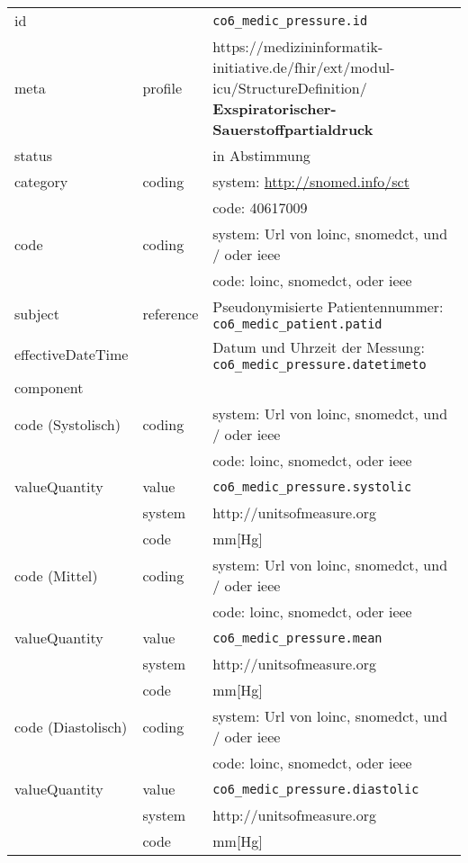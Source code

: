 \begin{longtable}{|l|l|p{7.5cm}|}
        \hline
        \rowcolor{lightgray} \multicolumn{3}{|l|}{Data Mapping (inhaltlich)} \\ \hline
        id &  & \texttt{co6\_medic\_pressure.id} \\ \hline
	meta & profile & https://medizininformatik-initiative.de/fhir/ext/modul-icu/StructureDefinition/\textbf{
Exspiratorischer-Sauerstoffpartialdruck} \\ \hline 
	status &  & in Abstimmung  \\ \hline 
	category & coding & system: \url{http://snomed.info/sct} \\ 
\cline{3-3}
        & & code: 40617009 \\ \hline
        code & coding & system: Url von \ac{loinc}, \ac{snomedct}, und / oder \ac{ieee} \\
        \cline{3-3}
         &  & code: \ac{loinc}, \ac{snomedct}, oder \ac{ieee} \\ \hline
        subject & reference & Pseudonymisierte Patientennummer: \texttt{co6\_medic\_patient.patid} \\ \hline
        effectiveDateTime & & Datum und Uhrzeit der Messung:  \texttt{co6\_medic\_pressure.datetimeto} \\ \hline
	\multicolumn{3}{|l|}{component} \\ \hline
	code (Systolisch)  & coding & system: Url von \ac{loinc}, \ac{snomedct}, und / oder \ac{ieee} \\ 
	\cline{3-3} 
	&  & code: \ac{loinc}, \ac{snomedct}, oder \ac{ieee} \\ \hline	
	valueQuantity & value & \texttt{co6\_medic\_pressure.systolic} \\
	\cline{2-3}
	& system & http://unitsofmeasure.org \\ 
	\cline{2-3}
	& code & mm[Hg] \\ \hline
	code (Mittel)  & coding & system: Url von \ac{loinc}, \ac{snomedct}, und / oder \ac{ieee} \\ 
	\cline{3-3} 
	&  & code: \ac{loinc}, \ac{snomedct}, oder \ac{ieee} \\ \hline	
	valueQuantity & value & \texttt{co6\_medic\_pressure.mean} \\
	\cline{2-3}
	& system & http://unitsofmeasure.org \\ 
	\cline{2-3}
	& code &  mm[Hg] \\ \hline
	code (Diastolisch)  & coding & system: Url von \ac{loinc}, \ac{snomedct}, und / oder \ac{ieee} \\ 
	\cline{3-3} 
	&  & code: \ac{loinc}, \ac{snomedct}, oder \ac{ieee} \\ \hline	
	valueQuantity & value & \texttt{co6\_medic\_pressure.diastolic} \\
	\cline{2-3}
	& system & http://unitsofmeasure.org \\ 
	\cline{2-3}
	& code & mm[Hg] \\ \hline
\end{longtable}
